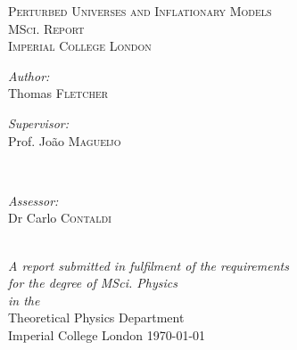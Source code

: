 \documentclass[12pt]{article} %
\begin{document}

\begin{titlepage}

\newcommand{\HRule}{\rule{\linewidth}{0.5mm}} %

\center %


\textsc{\LARGE Perturbed Universes and Inflationary Models}\\[0.5cm] %
\textsc{\Large MSci. Report}\\[0.5cm] %

\textsc{\large Imperial College London}\\[1.5cm] %

\begin{center}
\large \emph{Author:}\\
Thomas \textsc{Fletcher} %
\end{center}

\vspace{2cm}

\begin{minipage}{0.4\textwidth}
\begin{flushleft} \large
\emph{Supervisor:}\\
Prof. Jo\~{a}o \textsc{Magueijo} %
\end{flushleft}
\end{minipage}
~
\begin{minipage}{0.4\textwidth}
\begin{flushright} \large
\emph{Assessor:} \\
Dr Carlo  \textsc{Contaldi} %
\end{flushright}
\end{minipage}\\[3cm]


\large \textit{A report submitted in fulfilment of the requirements\\ for the degree of MSci. Physics}\\[0.3cm] %
\textit{in the}\\[0.4cm]
Theoretical Physics Department
\\ Imperial College London
\vfill %
{\large \today}\\[3cm] %




\end{titlepage}
\end{document}
